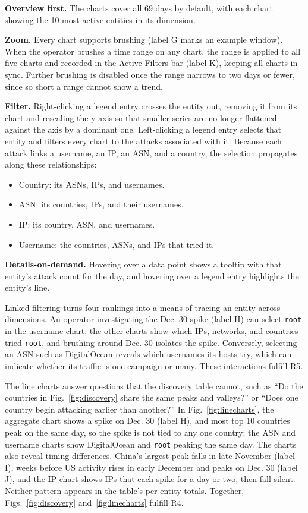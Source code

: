 \documentclass[conference]{IEEEtran}
\newcommand{\uname}[1]{\texttt{#1}}   %
\newcommand{\ui}[1]{{\sffamily\hyphenchar\font=-1 #1}}
\begin{document}
\textbf{Overview first.} The charts cover all 69 days by default, with each chart showing the 10 most active entities in its dimension.

\textbf{Zoom.} Every chart supports brushing (label G marks an example window). When the operator brushes a time range on any chart, the range is applied to all five charts and 
recorded in the \ui{Active Filters} bar (label K),
keeping all charts in sync. Further brushing is disabled once the range narrows to two days or fewer, 
since so short a range cannot show a trend.

\textbf{Filter.} Right-clicking a legend entry crosses the entity out, removing it from its chart and rescaling the y-axis so that smaller series are no longer flattened against the
axis by a dominant one. Left-clicking a legend entry selects that entity and filters every chart to the attacks associated with it. Because each attack links a username,
an IP, an ASN, and a country, the selection propagates along these relationships:
\begin{itemize}
  \item Country: its ASNs, IPs, and usernames.
  \item ASN: its countries, IPs, and their usernames.
  \item IP: its country, ASN, and usernames.
  \item Username: the countries, ASNs, and IPs that tried it.
\end{itemize}

\textbf{Details-on-demand.} Hovering over a data point shows a tooltip with that entity's attack count for the day, and hovering over a legend entry highlights the entity's line.

Linked filtering turns four rankings into a means of tracing an entity across dimensions. An operator investigating 
the Dec. 30 spike (label H) can select \uname{root} in the username chart; the other charts show which IPs, networks, and countries tried \uname{root}, and
brushing around Dec. 30 isolates the spike. Conversely, selecting an ASN such as \ui{DigitalOcean} reveals which usernames its hosts try, which can indicate
whether its traffic is one campaign or many. These interactions fulfill R5.

The line charts answer questions that the discovery table cannot, such as ``Do the countries in Fig.~\ref{fig:discovery} share the same peaks and valleys?'' or ``Does one country
begin attacking earlier than another?'' In Fig.~\ref{fig:linecharts}, the aggregate chart shows a spike on Dec. 30 (label H), and most top 10 countries peak on the same
day, so the spike is not tied to any one country; the ASN and username charts show \ui{DigitalOcean} and \uname{root} peaking the same day. 
The charts also reveal timing differences. China's largest peak falls in late
November (label I), weeks before US activity rises in early December and peaks on Dec. 30 (label J), and the IP chart shows IPs that each spike for a day or two, then fall silent. 
Neither pattern appears in the table's per-entity totals. Together, Figs.~\ref{fig:discovery} and~\ref{fig:linecharts} fulfill R4.
\end{document}
